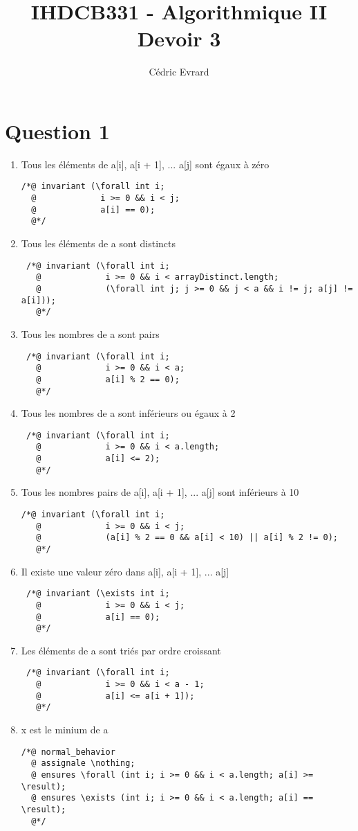 \documentclass{article}
\title{IHDCB331 - Algorithmique II\\
	\large{Devoir 3}
}
\author{Cédric Evrard}
\begin{document}
\maketitle

\section{Question 1}
\begin{enumerate}
	\item Tous les éléments de a[i], a[i + 1], ... a[j] sont égaux à zéro
\begin{lstlisting}
/*@ invariant (\forall int i;
  @             i >= 0 && i < j;
  @             a[i] == 0);
  @*/
\end{lstlisting}
	\item Tous les éléments de a sont distincts
\begin{lstlisting}
 /*@ invariant (\forall int i;
   @             i >= 0 && i < arrayDistinct.length;
   @             (\forall int j; j >= 0 && j < a && i != j; a[j] != a[i]));
   @*/
\end{lstlisting}
	\item Tous les nombres de a sont pairs
\begin{lstlisting}
 /*@ invariant (\forall int i;
   @             i >= 0 && i < a;
   @             a[i] % 2 == 0);
   @*/
\end{lstlisting}
	\item Tous les nombres de a sont inférieurs ou égaux à 2
\begin{lstlisting}
 /*@ invariant (\forall int i;
   @             i >= 0 && i < a.length;
   @             a[i] <= 2);
   @*/
\end{lstlisting}
	\item Tous les nombres pairs de a[i], a[i + 1], ... a[j] sont inférieurs à 10
\begin{lstlisting}
/*@ invariant (\forall int i;
   @             i >= 0 && i < j;
   @             (a[i] % 2 == 0 && a[i] < 10) || a[i] % 2 != 0);
   @*/
\end{lstlisting}
	\item Il existe une valeur zéro dans a[i], a[i + 1], ... a[j]
\begin{lstlisting}
 /*@ invariant (\exists int i;
   @             i >= 0 && i < j;
   @             a[i] == 0);
   @*/
\end{lstlisting}
	\item Les éléments de a sont triés par ordre croissant
\begin{lstlisting}
 /*@ invariant (\forall int i;
   @             i >= 0 && i < a - 1;
   @             a[i] <= a[i + 1]);
   @*/
\end{lstlisting}
	\item x est le minium de a
\begin{lstlisting}
/*@ normal_behavior
  @ assignale \nothing;
  @ ensures \forall (int i; i >= 0 && i < a.length; a[i] >= \result);
  @ ensures \exists (int i; i >= 0 && i < a.length; a[i] == \result);
  @*/
\end{lstlisting}
\end{enumerate}
\end{document}
